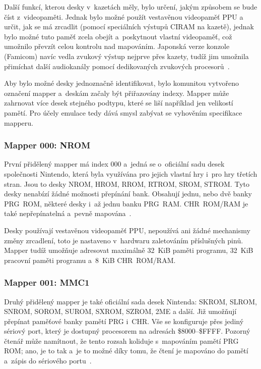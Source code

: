 Další funkcí, kterou desky v~kazetách měly, bylo určení, jakým způsobem se bude číst z~videopaměti. Jednak bylo možné použít vestavěnou videopaměť PPU a určit, jak se má zrcadlit (pomocí speciálních výstupů CIRAM na kazetě), jednak bylo možné tuto paměť zcela obejít a~poskytnout vlastní videopaměť, což umožnilo převzít celou kontrolu nad mapováním. Japonská verze konzole (Famicom) navíc vedla zvukový výstup nejprve přes kazety, tudíž jim umožnila přimíchat další audiokanály pomocí dedikovaných zvukových procesorů~\cite{Nesdev:mapper}.

Aby bylo možné desky jednoznačně identifikovat, bylo komunitou vytvořeno označení mapper a~deskám začaly být přiřazovány indexy. Mapper může zahrnovat více desek stejného podtypu, které se liší například jen velikostí pamětí. Pro účely emulace tedy dává smysl zabývat se vyhověním specifikace mapperu.

\subsubsection{Mapper 000: NROM}
První přidělený mapper má index 000 a~jedná se o~oficiální sadu desek společnosti Nintendo, která byla využívána pro jejich vlastní hry i~pro hry třetích stran. Jsou to desky NROM, HROM, RROM, RTROM, SROM, STROM.  Tyto desky nenabízí žádné možnosti přepínání bank. Obsahují jednu, nebo dvě banky PRG~ROM, některé desky i~až jednu banku PRG~RAM. CHR~ROM/RAM je také nepřepínatelná a~pevně mapována~\cite{Nesdev:mapper-000}.

Desky používají vestavěnou videopaměť PPU, nepoužívá ani žádné mechanismy změny zrcadlení, toto je nastaveno v~hardwaru zaletováním příslušných pinů. Mapper tudíž umožňuje adresovat maximálně 32~KiB paměti programu, 32~KiB pracovní paměti programu a~8~KiB CHR~ROM/RAM.

\subsubsection{Mapper 001: MMC1}
Druhý přidělený mapper je také oficiální sada desek Nintenda: SKROM, SLROM, SNROM, SOROM, SUROM, SXROM, SZROM, 2ME a další. Již umožňují přepínat paměťové banky pamětí PRG i~CHR. Vše se konfiguruje přes jediný sériový port, který je dostupný procesorem na adresách \$8000--\$FFFF. Pozorný čtenář může namítnout, že tento rozsah koliduje s~mapováním pamětí PRG ROM; ano, je to tak a~je to možné díky tomu, že čtení je mapováno do pamětí a~zápis do sériového portu~\cite{Nesdev:mapper-001}.

